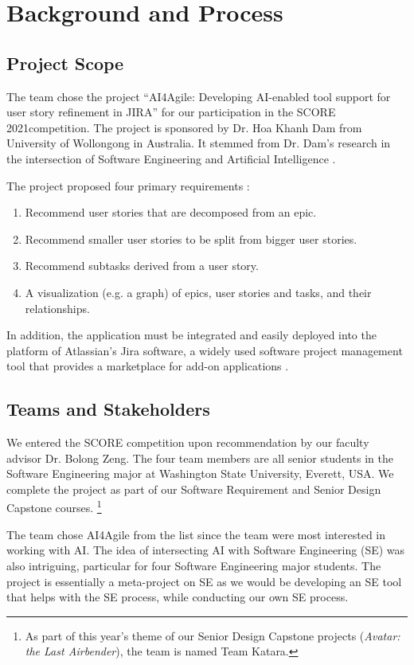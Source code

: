 \section{Background and Process}
\label{background}
\subsection{Project Scope}
\label{scope}
The team chose the project “AI4Agile: Developing AI-enabled tool support for user story refinement in JIRA” for our participation in the SCORE 2021competition. The project is sponsored by Dr. Hoa Khanh Dam from University of Wollongong in Australia. It stemmed from Dr. Dam's research in the intersection of Software Engineering and Artificial Intelligence \cite{dam1,dam2,dam3}. 

The project proposed four primary requirements \cite{proposal}:

\begin{enumerate}
	\item Recommend user stories that are decomposed from an epic.
	\item Recommend smaller user stories to be split from bigger user stories.
	\item Recommend subtasks derived from a user story.
	\item A visualization (e.g. a graph) of epics, user stories and tasks, and their relationships.
\end{enumerate}

In addition, the application must be integrated and easily deployed into the platform of Atlassian’s Jira software, a widely used software project management tool that provides a marketplace for add-on applications \cite{jira1}. 

\subsection{Teams and Stakeholders}
We entered the SCORE competition upon recommendation by our faculty advisor Dr. Bolong Zeng. The four team members are all senior students in the Software Engineering major at Washington State University, Everett, USA. We complete the project as part of our Software Requirement and Senior Design Capstone courses. \footnote{As part of this year's theme of our Senior Design Capstone projects (\emph{Avatar: the Last Airbender}), the team is named Team Katara.} 

The team chose AI4Agile from the list since the team were most interested in working with AI. The idea of intersecting AI with Software Engineering (SE) was also intriguing, particular for four Software Engineering major students. The project is essentially a meta-project on SE as we would be developing an SE tool that helps with the SE process, while conducting our own SE process. 

